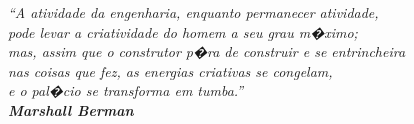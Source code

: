 




\pretextualchapter{}

\vspace{17.5cm}
\begin{flushright}

\textit{``A atividade da engenharia, enquanto permanecer atividade, \\
	 pode levar a criatividade do homem a seu grau m�ximo; \\
	 mas, assim que o construtor p�ra de construir e se entrincheira \\
	 nas coisas que fez, as energias criativas se congelam, \\
	 e o pal�cio se transforma em tumba.'' \\ 
	\bfseries Marshall Berman}%

\end{flushright}


